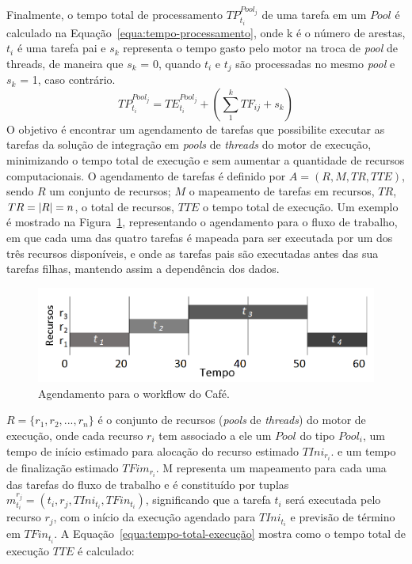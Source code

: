 Finalmente, o tempo total de processamento $TP_{{t_i}}^{Poo{l_j}}$ de uma tarefa em um $Pool$ é calculado na Equação~\ref{equa:tempo-processamento}, onde k é o número de arestas, $t_i$ é uma tarefa pai e $s_k$ representa o tempo gasto pelo motor na troca de \emph{pool} de threads, de maneira que $s_k$ = 0, quando $t_i$ e $t_j$ são processadas no mesmo \emph{pool} e  $s_k$ = 1, caso contrário.
\begin{equation}
TP_{{t_i}}^{Poo{l_j}} = TE_{{t_i}}^{Poo{l_j}} + (\sum\limits_1^k {T{F_{ij}} + {s_k}} )
\label{equa:tempo-processamento}
\end{equation}
%
%
%
%
O objetivo é encontrar um agendamento de tarefas que possibilite executar as tarefas da solução de integração em \emph{pools} de \emph{threads} do motor de execução, minimizando o tempo total de execução e sem aumentar a quantidade de recursos computacionais. O agendamento de tarefas é definido por $A= (R, M, TR, TTE)$, sendo $R$ um conjunto de recursos; $M$ o mapeamento de tarefas em recursos, $TR$, $TR=\arrowvert R\arrowvert =n$, o total de recursos, $TTE$ o tempo total de execução. Um exemplo é mostrado na Figura~\ref{fig:grafico-mapeamento}, representando o agendamento para o fluxo de trabalho, em que cada uma das quatro tarefas é mapeada para ser executada por um dos três recursos disponíveis, e onde as tarefas pais são executadas antes das sua tarefas filhas, mantendo assim a dependência dos dados.
\begin{figure}[htb]
	\centering
	\includegraphics[scale=0.2]{./figs/grafico-mapeamento.png}
	\caption{Agendamento para o workflow do Café.}
	\label{fig:grafico-mapeamento}
\end{figure}
$R = \{ {r_1},{r_2},...,{r_n}\}$  é o conjunto de recursos (\emph{pools} de \emph{threads}) do motor de execução, onde cada recurso $r_i$ tem associado a ele um $Pool$ do tipo $Pool_i$, um tempo de início estimado para alocação do recurso estimado ${TIni_{r_i}}$. e um tempo de finalização estimado ${TFim_{r_i}}$. M representa um mapeamento para cada uma das tarefas do fluxo de trabalho e é constituído por tuplas $ m_{{t_i}}^{{r_j}} = ({t_i},{r_j},TIn{i_{{t_i}}},TFi{n_{{t_i}}})$, significando que a tarefa $t_i$ será executada pelo recurso $r_j$, com o início da execução agendado para $ TIn{i_{{t_i}}} $ e previsão de término em $ TFi{n_{{t_i}}} $. A Equação~\ref{equa:tempo-total-execução} mostra como o tempo total de execução $ TTE $ é calculado:
